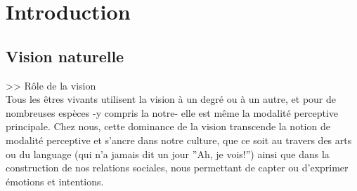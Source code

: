 
\chapter{Introduction} %
\label{Introduction} %


\newcommand{\keyword}[1]{\textbf{#1}}
\newcommand{\tabhead}[1]{\textbf{#1}}
\newcommand{\code}[1]{\texttt{#1}}
\newcommand{\file}[1]{\texttt{\bfseries#1}}
\newcommand{\option}[1]{\texttt{\itshape#1}}


\section{Vision naturelle}
>> Rôle de la vision\\
Tous  les êtres vivants utilisent la vision à un degré ou à un autre, et pour de nombreuses espèces -y compris la notre- elle est même la modalité perceptive principale. Chez nous, cette dominance de la vision transcende la notion de modalité perceptive et s'ancre dans notre culture, que ce soit au travers des arts ou du language (qui n'a jamais dit un jour ''Ah, je vois!'') ainsi que dans la construction de nos relations sociales, nous permettant de capter ou d'exprimer émotions et intentions.

